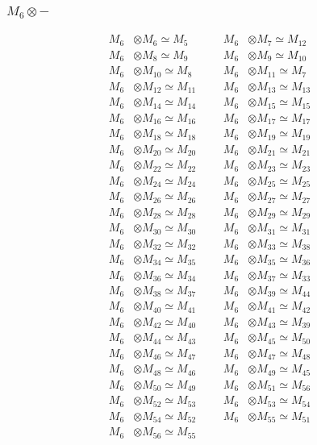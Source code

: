 \subsubsection{$ M_{6}\otimes -$}
\begin{align*}
M_{6} &\otimes M_{6} \simeq M_{5} &&& M_{6} &\otimes M_{7} \simeq M_{12}\\
M_{6} &\otimes M_{8} \simeq M_{9} &&& M_{6} &\otimes M_{9} \simeq M_{10}\\
M_{6} &\otimes M_{10} \simeq M_{8} &&& M_{6} &\otimes M_{11} \simeq M_{7}\\
M_{6} &\otimes M_{12} \simeq M_{11} &&& M_{6} &\otimes M_{13} \simeq M_{13}\\
M_{6} &\otimes M_{14} \simeq M_{14} &&& M_{6} &\otimes M_{15} \simeq M_{15}\\
M_{6} &\otimes M_{16} \simeq M_{16} &&& M_{6} &\otimes M_{17} \simeq M_{17}\\
M_{6} &\otimes M_{18} \simeq M_{18} &&& M_{6} &\otimes M_{19} \simeq M_{19}\\
M_{6} &\otimes M_{20} \simeq M_{20} &&& M_{6} &\otimes M_{21} \simeq M_{21}\\
M_{6} &\otimes M_{22} \simeq M_{22} &&& M_{6} &\otimes M_{23} \simeq M_{23}\\
M_{6} &\otimes M_{24} \simeq M_{24} &&& M_{6} &\otimes M_{25} \simeq M_{25}\\
M_{6} &\otimes M_{26} \simeq M_{26} &&& M_{6} &\otimes M_{27} \simeq M_{27}\\
M_{6} &\otimes M_{28} \simeq M_{28} &&& M_{6} &\otimes M_{29} \simeq M_{29}\\
M_{6} &\otimes M_{30} \simeq M_{30} &&& M_{6} &\otimes M_{31} \simeq M_{31}\\
M_{6} &\otimes M_{32} \simeq M_{32} &&& M_{6} &\otimes M_{33} \simeq M_{38}\\
M_{6} &\otimes M_{34} \simeq M_{35} &&& M_{6} &\otimes M_{35} \simeq M_{36}\\
M_{6} &\otimes M_{36} \simeq M_{34} &&& M_{6} &\otimes M_{37} \simeq M_{33}\\
M_{6} &\otimes M_{38} \simeq M_{37} &&& M_{6} &\otimes M_{39} \simeq M_{44}\\
M_{6} &\otimes M_{40} \simeq M_{41} &&& M_{6} &\otimes M_{41} \simeq M_{42}\\
M_{6} &\otimes M_{42} \simeq M_{40} &&& M_{6} &\otimes M_{43} \simeq M_{39}\\
M_{6} &\otimes M_{44} \simeq M_{43} &&& M_{6} &\otimes M_{45} \simeq M_{50}\\
M_{6} &\otimes M_{46} \simeq M_{47} &&& M_{6} &\otimes M_{47} \simeq M_{48}\\
M_{6} &\otimes M_{48} \simeq M_{46} &&& M_{6} &\otimes M_{49} \simeq M_{45}\\
M_{6} &\otimes M_{50} \simeq M_{49} &&& M_{6} &\otimes M_{51} \simeq M_{56}\\
M_{6} &\otimes M_{52} \simeq M_{53} &&& M_{6} &\otimes M_{53} \simeq M_{54}\\
M_{6} &\otimes M_{54} \simeq M_{52} &&& M_{6} &\otimes M_{55} \simeq M_{51}\\
M_{6} &\otimes M_{56} \simeq M_{55}
\end{align*}

